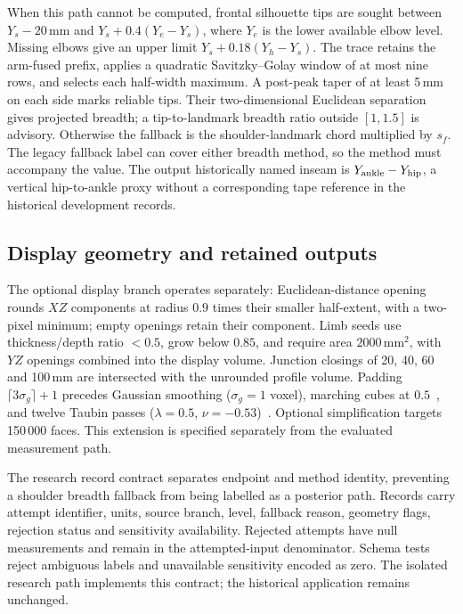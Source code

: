 \documentclass[11pt,a4paper]{article}
\begin{document}
When this path cannot be computed, frontal silhouette tips are sought between $Y_s-20$\,mm and $Y_s+0.4(Y_e-Y_s)$, where $Y_e$ is the lower available elbow level. Missing elbows give an upper limit $Y_s+0.18(Y_h-Y_s)$. The trace retains the arm-fused prefix, applies a quadratic Savitzky--Golay window of at most nine rows, and selects each half-width maximum. A post-peak taper of at least 5\,mm on each side marks reliable tips. Their two-dimensional Euclidean separation gives projected breadth; a tip-to-landmark breadth ratio outside $[1,1.5]$ is advisory. Otherwise the fallback is the shoulder-landmark chord multiplied by $s_f$. The legacy fallback label can cover either breadth method, so the method must accompany the value. The output historically named inseam is $Y_{\rm ankle}-Y_{\rm hip}$, a vertical hip-to-ankle proxy without a corresponding tape reference in the historical development records.

\subsection{Display geometry and retained outputs}
The optional display branch operates separately: Euclidean-distance opening rounds $XZ$ components at radius $0.9$ times their smaller half-extent, with a two-pixel minimum; empty openings retain their component. Limb seeds use thickness/depth ratio $<0.5$, grow below $0.85$, and require area $2000$\,mm$^2$, with $YZ$ openings combined into the display volume. Junction closings of 20, 40, 60 and 100\,mm are intersected with the unrounded profile volume. Padding $\lceil3\sigma_g\rceil+1$ precedes Gaussian smoothing ($\sigma_g=1$ voxel), marching cubes at $0.5$~\cite{lorensen1987marching}, and twelve Taubin passes ($\lambda=0.5$, $\nu=-0.53$)~\cite{taubin1995signal}. Optional simplification targets 150\,000 faces. This extension is specified separately from the evaluated measurement path.

The research record contract separates endpoint and method identity, preventing a shoulder breadth fallback from being labelled as a posterior path. Records carry attempt identifier, units, source branch, level, fallback reason, geometry flags, rejection status and sensitivity availability. Rejected attempts have null measurements and remain in the attempted-input denominator. Schema tests reject ambiguous labels and unavailable sensitivity encoded as zero. The isolated research path implements this contract; the historical application remains unchanged.
\end{document}
